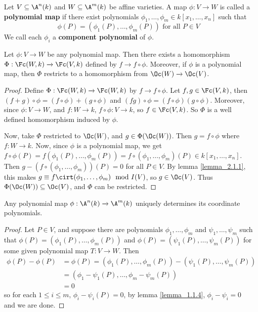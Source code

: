 \begin{definition}
  Let $V \subseteq \A^n(k)$ and $W \subseteq \A^m(k)$ be affine varieties. A map
  $\phi:V \xrightarrow{} W$ is called a \textbf{polynomial map} if there exist
  polynomials $\phi_1, \dots, \phi_m \in k[x_1, \dots, x_n]$ such that
  \begin{equation*}
    \phi(P)=(\phi_1(P), \dots, \phi_m(P)) \text{ for all } P \in V
  \end{equation*}
  We call each $\phi_i$ a \textbf{component polynomial} of $\phi$.
\end{definition}

\begin{lemma}\label{lemma_2.1.4}
  Let $\phi:V \xrightarrow{} W$ be any polynomial map. Then there exists a
  homomorphism $\Phi:\Fc(W,k) \xrightarrow{} \Fc(V,k)$ defined by $f
  \xrightarrow{} f \circ \phi$. Moreover, if $\phi$ is a polynomial map, then
  $\Phi$ restricts to a homomorphism from  $\Oc(W) \xrightarrow{} \Oc(V)$.
\end{lemma}
\begin{proof}
  Define $\Phi:\Fc(W,k) \xrightarrow{} \Fc(W,k)$ by $f \xrightarrow{} f \circ
  \phi$. Let $f,g \in \Fc(V,k)$, then $(f+g) \circ \phi=(f \circ \phi)+(g \circ
  \phi)$ and $(fg) \circ \phi=(f \circ \phi)(g \circ \phi)$. Moreover, since
  $\phi:V \xrightarrow{} W$, and $f:W \xrightarrow{} k$, $f \circ \phi: V
  \xrightarrow{} k$, so $f \in \Fc(V,k)$. So $\Phi$ is a well defined
  homomorphism induced by $\phi$.

  Now, take $\Phi$ restricted to $\Oc(W)$, and $g \in \Phi(\Oc(W))$. Then $g=f
  \circ \phi$ where $f:W \xrightarrow{} k$. Now, since $\phi$ is a polynomial
  map, we get $f \circ \phi(P)=f(\phi_1(P), \dots, \phi_m(P))=f \circ (\phi_1, \dots,
  \phi_m)(P) \in k[x_1, \dots, x_n]$. Then $g-(f \circ (\phi_1, \dots, \phi_m))(P)=0$ for
  all $P \in V$. By lemma \ref{lemma_2.1.1}, this makes $g \equiv f \cirt (\phi_1,
  \dots, \phi_m) \mod{I(V)}$, so $g \in \Oc(V)$. Thus $\Phi(\Oc(W)) \subseteq
  \Oc(V)$, and $\Phi$ can be restricted.
\end{proof}

\begin{lemma}\label{lemma_2.1.5}
  Any polynomial map $\phi:\A^n(k) \xrightarrow{} \A^m(k)$ uniquely determines its
  coordinate polynomials.
\end{lemma}
\begin{proof}
  Let $P \in V$, and suppose there are polynomials $\phi_1, \dots, \phi_m$ and $\psi_1,
  \dots, \psi_m$ such that $\phi(P)=(\phi_1(P), \dots, \phi_m(P))$ and
  $\phi(P)=(\psi_1(P), \dots, \psi_m(P))$ for some given polynomial map
  $T:V \xrightarrow{} W$. Then
  \begin{align*}
    \phi(P)-\phi(P) &= \phi(P)=(\phi_1(P), \dots, \phi_m(P))-(\psi_1(P), \dots, \psi_m(P)) \\
        &=  (\phi_1-\psi_1(P), \dots, \phi_m-\psi_m(P))  \\
        &=  0
  \end{align*}
  so for each $1 \leq i \leq m$, $\phi_i-\psi_i(P)=0$, by lemma \ref{lemma_1.1.4},
  $\phi_i-\psi_i=0$ and we are done.
\end{proof}


